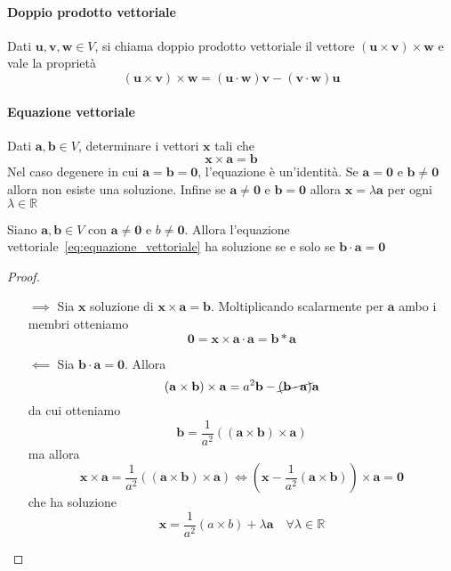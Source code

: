 \paragraph{Doppio prodotto vettoriale} Dati \(\mathbf{u} , \mathbf{v} ,
\mathbf{w}  \in V\), si chiama doppio prodotto vettoriale il vettore
\({(\mathbf{u}  \times \mathbf{v} )} \times \mathbf{w} \) e vale la proprietà
\[
  {(\mathbf{u} \times \mathbf{v} )} \times \mathbf{w}  = {(\mathbf{u} \cdot
  \mathbf{w} )}\mathbf{v} - {(\mathbf{v} \cdot \mathbf{w} )}\mathbf{u} 
\]
\paragraph{Equazione vettoriale}
Dati \(\mathbf{a} , \mathbf{b}  \in V\), determinare i vettori \(\mathbf{x} \)
tali che
\begin{equation}\label{eq:equazione_vettoriale}
  \mathbf{x}  \times  \mathbf{a} = \mathbf{b} 
\end{equation}
Nel caso degenere in cui \(\mathbf{a} = \mathbf{b} = \mathbf{0}\), l'equazione è
un'identità. Se \(\mathbf{a} = \mathbf{0} \) e \(\mathbf{b} \neq \mathbf{0}  \) allora non esiste
una soluzione. Infine se \(\mathbf{a} \neq \mathbf{0}\) e \(\mathbf{b} = \mathbf{0}  \) allora
\(\mathbf{x}  = \lambda \mathbf{a} \) per ogni \(\lambda \in \mathbb{R}\) 

\begin{proposition}
    Siano \(\mathbf{a} , \mathbf{b} \in V \) con \(\mathbf{a} \neq \mathbf{0} \) e \(b
    \neq \mathbf{0} \). Allora l'equazione vettoriale~\eqref{eq:equazione_vettoriale} ha
    soluzione se e solo se \(\mathbf{b} \cdot \mathbf{a}  = \mathbf{0} \) 
\end{proposition}
\begin{proof}\( \)
\begin{itemize}
    \item[\(\implies \)] Sia \(\mathbf{x} \) soluzione di \(\mathbf{x} \times
        \mathbf{a} = \mathbf{b}\). Moltiplicando scalarmente per \(\mathbf{a} \)
        ambo i membri otteniamo
        \[
          \mathbf{0}  = \mathbf{x}  \times \mathbf{a} \cdot \mathbf{a} = \mathbf{b} * \mathbf{a} 
        \]
    \item[\(\impliedby \)] Sia \(\mathbf{b}\cdot \mathbf{a} = \mathbf{0} \). Allora
        \[
          {(\mathbf{a} \times \mathbf{b})}\times \mathbf{a}  = a^2 \mathbf{b} -
          \cancel{{(\mathbf{b}\cdot \mathbf{a} )}}\mathbf{a} 
        \]
        da cui otteniamo
        \[
          \mathbf{b} = \frac{1}{a^2} {\left( {(\mathbf{a} \times
          \mathbf{b})}\times \mathbf{a}  \right)} 
        \]
        ma allora
        \[
          \mathbf{x}  \times \mathbf{a} = \frac{1}{a^2}  {\left( {(\mathbf{a} \times
          \mathbf{b})}\times \mathbf{a}  \right)} \iff {\left( \mathbf{x} -
  \frac{1}{a^2}{(\mathbf{a} \times \mathbf{b})} \right)} \times \mathbf{a} = \mathbf{0} 
        \]
        che ha soluzione 
        \[
            \mathbf{x}  = \frac{1}{a^2}{(a \times b)} + \lambda \mathbf{a} \quad
            \forall \lambda \in \mathbb{R}
        \]
\end{itemize}
\end{proof}

